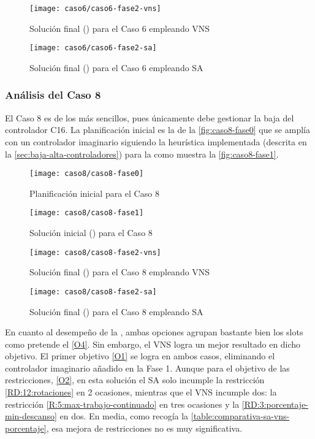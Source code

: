 \begin{figure}[!]
	\centering
	\texttt{[image: caso6/caso6-fase2-vns]}
	\caption{Solución final (\fasedos{}) para el Caso 6 empleando VNS}
	\label{fig:caso6-fase2-vns}
\end{figure}

\begin{figure}[!]
	\centering
	\texttt{[image: caso6/caso6-fase2-sa]}
	\caption{Solución final (\fasedos{}) para el Caso 6 empleando SA}
	\label{fig:caso6-fase2-sa}
\end{figure}

\subsubsection{Análisis del Caso 8}

El Caso 8 es de los más sencillos, pues únicamente debe gestionar la baja del controlador C16. La planificación inicial es la de la \autoref{fig:caso8-fase0} que se amplía con un controlador imaginario siguiendo la heurística implementada (descrita en la \autoref{sec:baja-alta-controladores}) para la \faseuno{} como muestra la \autoref{fig:caso8-fase1}. 

\begin{figure}[!]
	\centering
	\texttt{[image: caso8/caso8-fase0]}
	\caption{Planificación inicial para el Caso 8}
	\label{fig:caso8-fase0}
\end{figure}

\begin{figure}[!]
	\centering
	\texttt{[image: caso8/caso8-fase1]}
	\caption{Solución inicial (\faseuno{}) para el Caso 8}
	\label{fig:caso8-fase1}
\end{figure}

\begin{figure}[!]
	\centering
	\texttt{[image: caso8/caso8-fase2-vns]}
	\caption{Solución final (\fasedos{}) para el Caso 8 empleando VNS}
	\label{fig:caso8-fase2-vns}
\end{figure}

\begin{figure}[!]
	\centering
	\texttt{[image: caso8/caso8-fase2-sa]}
	\caption{Solución final (\fasedos{}) para el Caso 8 empleando SA}
	\label{fig:caso8-fase2-sa}
\end{figure}

En cuanto al desempeño de la \fasedos{}, ambas opciones agrupan bastante bien los slots como pretende el \ref{O4}. Sin embargo, el VNS logra un mejor resultado en dicho objetivo. El primer objetivo \ref{O1} se logra en ambos casos, eliminando el controlador imaginario añadido en la Fase 1. Aunque para el objetivo de las restricciones, \ref{O2}, en esta solución el SA solo incumple la restricción \ref{RD:12:rotaciones} en 2 ocasiones, mientras que el VNS incumple dos: la restricción \ref{R:5:max-trabajo-continuado} en tres ocasiones y la \ref{RD:3:porcentaje-min-descanso} en dos.
En media, como recogía la \autoref{table:comparativa-sa-vns-porcentaje}, esa mejora de restricciones no es muy significativa.

